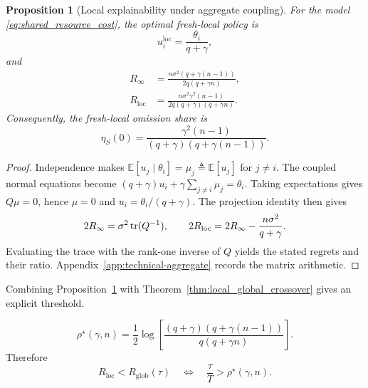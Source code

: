 \documentclass[11pt]{article}
\newtheorem{proposition}{Proposition}
\begin{document}
\begin{proposition}[Local explainability under aggregate coupling]
\label{prop:aggregate_local}
For the model \eqref{eq:shared_resource_cost}, the optimal fresh-local policy
is
\begin{equation}
    u_i^{\mathrm{loc}}
    =
    \frac{\theta_i}{q+\gamma},
    \label{eq:optimal_local_shared}
\end{equation}
and
\begin{align}
    R_\infty
    &=
    \frac{
        n\sigma^2
        \left(
            q+\gamma(n-1)
        \right)
    }{
        2q(q+\gamma n)
    },
    \label{eq:aggregate_Rinf}
    \\
    R_{\mathrm{loc}}
    &=
    \frac{
        n\sigma^2\gamma^2(n-1)
    }{
        2q(q+\gamma)(q+\gamma n)
    }.
    \label{eq:aggregate_Rloc}
\end{align}
Consequently, the fresh-local omission share is
\begin{equation}
    \boxed{
    \eta_S(0)
    =
    \frac{
        \gamma^2(n-1)
    }{
        (q+\gamma)
        \left(
            q+\gamma(n-1)
        \right)
    }.
    }
    \label{eq:aggregate_eta}
\end{equation}
\end{proposition}

\begin{proof}
Independence makes $\mathbb E[u_j\mid\theta_i]=\mu_j\triangleq\mathbb E[u_j]$
for $j\ne i$. The coupled normal equations become
$(q+\gamma)u_i+\gamma\sum_{j\ne i}\mu_j=\theta_i$.
Taking expectations gives $Q\mu=0$, hence $\mu=0$ and
$u_i=\theta_i/(q+\gamma)$. The projection identity then gives
\[
2R_\infty=\sigma^2\operatorname{tr}(Q^{-1}),\qquad
2R_{\rm loc}=2R_\infty-\frac{n\sigma^2}{q+\gamma}.
\]
Evaluating the trace with the rank-one inverse of $Q$ yields the stated
regrets and their ratio. Appendix~\ref{app:technical-aggregate} records
the matrix arithmetic.
\end{proof}

Combining Proposition~\ref{prop:aggregate_local} with
Theorem~\ref{thm:local_global_crossover} gives an explicit threshold.

\begin{equation}
    \boxed{
    \rho^\star(\gamma,n)
    =
    \frac{1}{2}
    \log
    \left[
        \frac{
            (q+\gamma)
            \left(
                q+\gamma(n-1)
            \right)
        }{
            q(q+\gamma n)
        }
    \right].
    }
    \label{eq:aggregate_rho_star}
\end{equation}
Therefore
\begin{equation}
    R_{\mathrm{loc}}
    <
    R_{\mathrm{glob}}(\tau)
    \quad\Longleftrightarrow\quad
    \frac{\tau}{T}
    >
    \rho^\star(\gamma,n).
    \label{eq:aggregate_crossover}
\end{equation}
\end{document}
